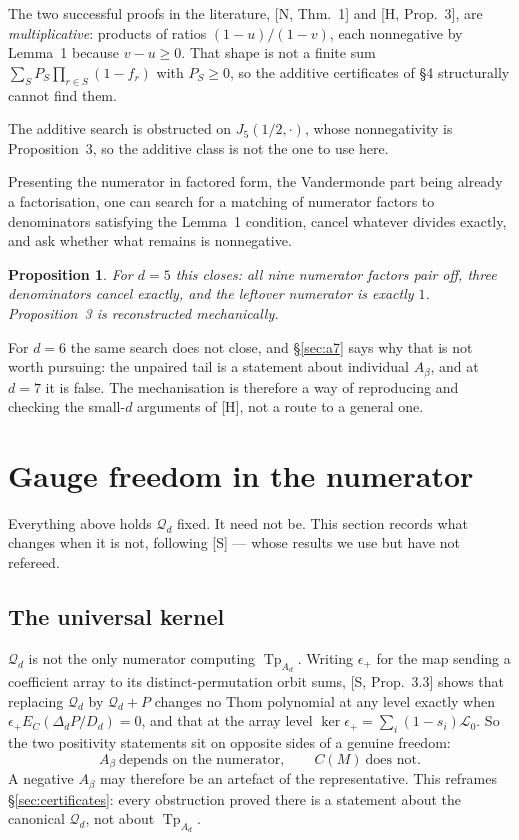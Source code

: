 \documentclass[11pt,a4paper]{article}
\DeclareMathOperator{\Tp}{Tp}
\newcommand{\Qd}{\mathcal{Q}}
\theoremstyle{plain}
\newtheorem{proposition}{Proposition}
\theoremstyle{definition}
\theoremstyle{remark}
\begin{document}
The two successful proofs in the literature, [N, Thm.~1] and [H, Prop.~3], are
\emph{multiplicative}: products of ratios $(1-u)/(1-v)$, each nonnegative by Lemma~1 because
$v - u \ge 0$. That shape is not a finite sum $\sum_S P_S \prod_{r \in S}(1 - f_r)$ with
$P_S \ge 0$, so the additive certificates of \S4 structurally cannot find them.

The additive search is obstructed on $J_5(1/2,\cdot)$, whose nonnegativity is Proposition~3, so
the additive class is not the one to use here.

Presenting the numerator in factored form, the Vandermonde part being already a factorisation,
one can search for a matching of numerator factors to denominators satisfying the Lemma~1
condition, cancel whatever divides exactly, and ask whether what remains is nonnegative.

\begin{proposition}
For $d = 5$ this closes: all nine numerator factors pair off, three denominators cancel exactly,
and the leftover numerator is exactly $1$. Proposition~3 is reconstructed mechanically.
\end{proposition}

For $d = 6$ the same search does not close, and \S\ref{sec:a7} says why that is not worth
pursuing: the unpaired tail is a statement about individual $A_\beta$, and at $d = 7$ it is false.
The mechanisation is therefore a way of reproducing and checking the small-$d$ arguments of [H],
not a route to a general one.

\section{Gauge freedom in the numerator}
\label{sec:gauge}

Everything above holds $\Qd_d$ fixed. It need not be. This section records what changes when
it is not, following [S] --- whose results we use but have not refereed.

\subsection{The universal kernel}

$\Qd_d$ is not the only numerator computing $\Tp_{A_d}$. Writing $\epsilon_+$ for the map
sending a coefficient array to its distinct-permutation orbit sums, [S, Prop.~3.3] shows that
replacing $\Qd_d$ by $\Qd_d + P$ changes no Thom polynomial at any level exactly when
$\epsilon_+ E_C(\Delta_d P / D_d) = 0$, and that at the array level
$\ker \epsilon_+ = \sum_{i} (1 - s_i)\mathcal{L}_0$. So the two positivity statements sit on
opposite sides of a genuine freedom:
\[
  A_\beta \ \text{depends on the numerator}, \qquad C(M) \ \text{does not}.
\]
A negative $A_\beta$ may therefore be an artefact of the representative. This reframes
\S\ref{sec:certificates}: every obstruction proved there is a statement about the canonical
$\Qd_d$, not about $\Tp_{A_d}$.
\end{document}
